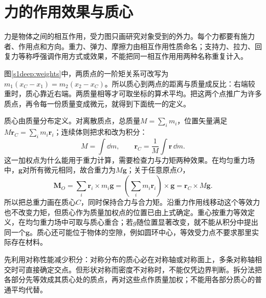 \section{力的作用效果与质心}
力是物体之间的相互作用，受力图只画研究对象受到的外力。每个力都要有施力者、作用点和方向。重力、弹力、摩擦力由相互作用性质命名；支持力、拉力、回复力等称呼强调作用方式或效果，不能把同一相互作用用两种名称重复计入。

图\ref{s1deep:weights}中，两质点的一阶矩关系可改写为 $m_1(x_C-x_1)=m_2(x_2-x_C)$。所以质心到两点的距离与质量成反比：右端较重时，质心靠近右端。两质量相等才可取坐标的算术平均。把这两个点推广为许多质点，再令每一份质量变成微元，就得到下面统一的定义。

质心由质量分布定义。对离散质点，总质量$M=\sum_i m_i$，位置矢量满足$M\boldsymbol r_C=\sum_i m_i\boldsymbol r_i$；连续体则把求和改为积分：
\[
M=\int\dd m,\qquad
\boldsymbol r_C=\frac1M\int\boldsymbol r\,\dd m.
\]
这一加权点为什么能用于重力计算，需要检查力与力矩两种效果。在均匀重力场中，$\boldsymbol g$对所有微元相同，故合重力为$M\boldsymbol g$；关于任意原点$O$，
\[
\boldsymbol M_O=\sum_i\boldsymbol r_i\times m_i\boldsymbol g
=\left(\sum_i m_i\boldsymbol r_i\right)\times\boldsymbol g
=\boldsymbol r_C\times M\boldsymbol g.
\]
所以把总重力画在质心$C$，同时保持合力与合力矩。沿重力作用线移动这个等效力也不改变力矩，但质心作为质量加权点的位置已由上式确定。重心按重力等效定义，在均匀重力场中可取与质心重合；若$g$随位置显著改变，就不能从积分中提出同一个$\boldsymbol g$。质心还可能位于物体的空隙，例如圆环中心，等效受力点不要求那里实际存在材料。

先利用对称性能减少积分：对称分布的质心必在对称轴或对称面上，多条对称轴相交时可直接确定交点。但形状对称而密度不对称时，不能仅凭边界判断。拆分法把各部分先等效成其质心处的质点，再对这些点作质量加权；不能用各部分质心的普通平均代替。


